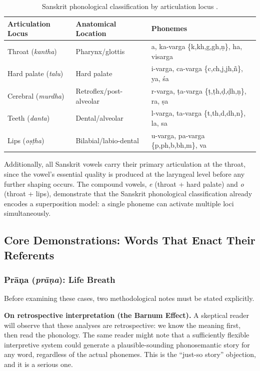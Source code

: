 \documentclass[12pt]{article}
\begin{document}
\begin{table}[htbp]
\centering
\renewcommand{\arraystretch}{1.3}
\begin{tabular}{lll}
\toprule
\textbf{Articulation Locus} & \textbf{Anatomical Location} & \textbf{Phonemes} \\
\midrule
Throat (\textit{kantha}) & Pharynx/glottis & a, ka-varga \{k,kh,g,gh,\d{n}\}, ha, visarga \\
Hard palate (\textit{talu}) & Hard palate & i-varga, ca-varga \{c,ch,j,jh,\~{n}\}, ya, \'{s}a \\
Cerebral (\textit{murdha}) & Retroflex/post-alveolar & r-varga, \d{t}a-varga \{\d{t},\d{t}h,\d{d},\d{d}h,\d{n}\}, ra, \d{s}a \\
Teeth (\textit{danta}) & Dental/alveolar & l-varga, ta-varga \{t,th,d,dh,n\}, la, sa \\
Lips (\textit{o\d{s}\d{t}ha}) & Bilabial/labio-dental & u-varga, pa-varga \{p,ph,b,bh,m\}, va \\
\bottomrule
\end{tabular}
\caption{Sanskrit phonological classification by articulation locus \citep{panini500bce, allen1953}.}
\end{table}

Additionally, all Sanskrit vowels carry their primary articulation at the throat, since the vowel's essential quality is produced at the laryngeal level before any further shaping occurs. The compound vowels, \textit{e} (throat + hard palate) and \textit{o} (throat + lips), demonstrate that the Sanskrit phonological classification already encodes a superposition model: a single phoneme can activate multiple loci simultaneously.

\subsection{Core Demonstrations: Words That Enact Their Referents}

\subsubsection{Pr\={a}\d{n}a (\textit{pr\={a}\d{n}a}): Life Breath}

Before examining these cases, two methodological notes must be stated explicitly.

\textbf{On retrospective interpretation (the Barnum Effect).} A skeptical reader will observe that these analyses are retrospective: we know the meaning first, then read the phonology. The same reader might note that a sufficiently flexible interpretive system could generate a plausible-sounding phonosemantic story for any word, regardless of the actual phonemes. This is the ``just-so story'' objection, and it is a serious one.
\end{document}
